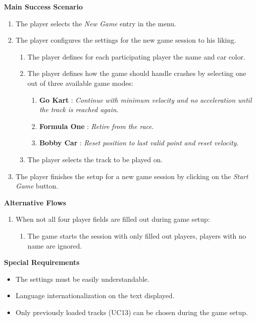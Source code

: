 			\textbf{Main Success Scenario}
				\begin{enumerate}
					\item The player selects the \textit{New Game} entry in the menu.
					\item The player configures the settings for the new game session to his liking.
					\begin{enumerate}
						\item The player defines for each participating player the name and car color.
						\item The player defines how the game should handle crashes by selecting one out of three available game modes:
						\begin{enumerate}
							\item \textbf{Go Kart} : \textit{Continue with minimum velocity and no acceleration until the track is reached again}.
							\item \textbf{Formula One} : \textit{Retire from the race}.
							\item \textbf{Bobby Car} : \textit{Reset position to last valid point and reset velocity}.
						\end{enumerate}
						\item The player selects the track to be played on.
					\end{enumerate}
					\item The player finishes the setup for a new game session by clicking on the \textit{Start Game} button.
				\end{enumerate}
	
			\textbf{Alternative Flows}
				\begin{enumerate}
					\item When not all four player fields are filled out during game setup:
					\begin{enumerate}
						\item The game starts the session with only filled out players, players with no name are ignored.
					\end{enumerate}
				\end{enumerate}
	
			\textbf{Special Requirements}
				\begin{itemize}
					\item The settings must be easily understandable.
					\item Language internationalization on the text displayed.
					\item Only previously loaded tracks (UC13) can be chosen during the game setup.
				\end{itemize}
	
